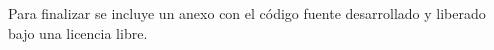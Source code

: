 \bigskip
Para finalizar se incluye un anexo con el código fuente desarrollado y liberado bajo una licencia libre.










